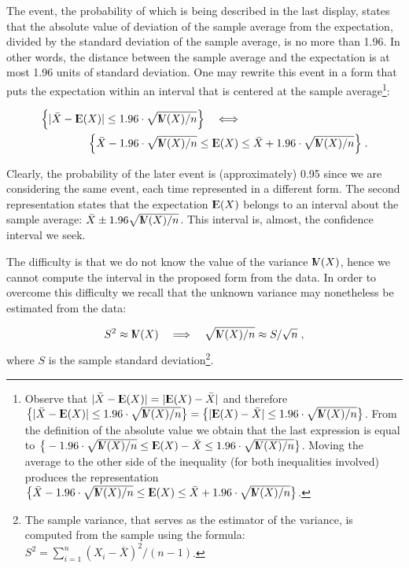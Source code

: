 \documentclass[]{krantz}
\newcommand{\Expec}{{\rm I\kern-.3em E}}
\newcommand{\Var}{{\rm I\kern-.3em V}}
\theoremstyle{definition}
\theoremstyle{definition}
\theoremstyle{definition}
\theoremstyle{remark}
\begin{document}
The event, the probability of which is being described in the last
display, states that the absolute value of deviation of the sample
average from the expectation, divided by the standard deviation of the
sample average, is no more than 1.96. In other words, the distance
between the sample average and the expectation is at most 1.96 units of
standard deviation. One may rewrite this event in a form that puts the
expectation within an interval that is centered at the sample
average\footnote{Observe that \(|\bar X - \Expec(X)| = |\Expec(X) -\bar X |\) and
  therefore
  \(\big\{|\bar X - \Expec(X)| \leq 1.96 \cdot \sqrt{\Var(X)/n} \big\} =\big\{| \Expec(X)-\bar X | \leq 1.96 \cdot \sqrt{\Var(X)/n} \big\}\).
  From the definition of the absolute value we obtain that the last
  expression is equal to
  \(\big\{-1.96 \cdot \sqrt{\Var(X)/n} \leq \Expec(X)-\bar X \leq 1.96 \cdot \sqrt{\Var(X)/n} \big\}\).
  Moving the average to the other side of the inequality (for both
  inequalities involved) produces the representation
  \(\big\{\bar X-1.96 \cdot \sqrt{\Var(X)/n} \leq \Expec(X)\leq \bar X + 1.96 \cdot \sqrt{\Var(X)/n} \big\}\).}:

\[\begin{aligned}
\Big\{|\bar X - \Expec(X)| \leq 1.96 \cdot \sqrt{\Var(X)/n} \Big\} \quad \Longleftrightarrow & \\
 \Big\{ \bar X -1.96 \cdot\sqrt{\Var(X)/n} \leq  \Expec(X) &\leq \bar X + 1.96 \cdot \sqrt{\Var(X)/n}\Big\}\;.\end{aligned}\]

Clearly, the probability of the later event is (approximately) 0.95
since we are considering the same event, each time represented in a
different form. The second representation states that the expectation
\(\Expec(X)\) belongs to an interval about the sample average:
\(\bar X \pm 1.96 \sqrt{\Var(X)/n}\). This interval is, almost, the
confidence interval we seek.

The difficulty is that we do not know the value of the variance
\(\Var(X)\), hence we cannot compute the interval in the proposed form
from the data. In order to overcome this difficulty we recall that the
unknown variance may nonetheless be estimated from the data:

\[S^2 \approx \Var(X) \quad \Longrightarrow \quad \sqrt{\Var(X)/n} \approx S/\sqrt{n}\;,\]
where \(S\) is the sample standard deviation\footnote{The sample variance, that serves as the estimator of the variance,
  is computed from the sample using the formula:
  \(S^2 = \sum_{i=1}^n (X_i-\bar X)^2/(n-1)\).}.
\end{document}
